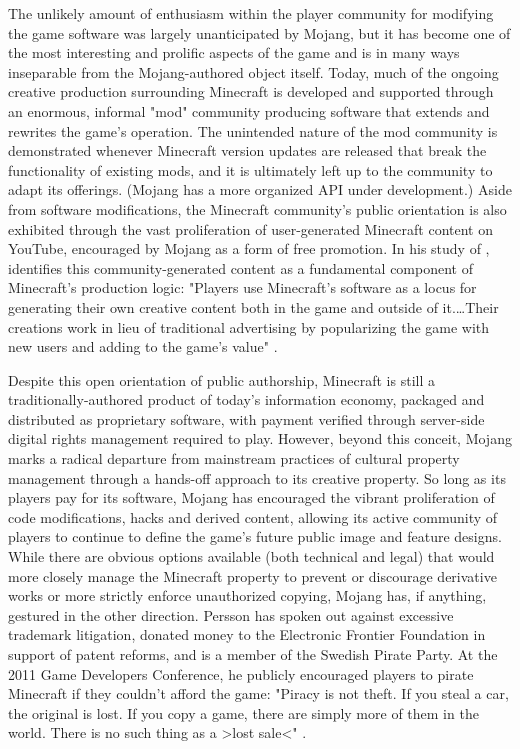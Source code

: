 The unlikely amount of enthusiasm within the player community for modifying the game software was largely unanticipated by Mojang, but it has become one of the most interesting and prolific aspects of the game and is in many ways inseparable from the Mojang-authored object itself. Today, much of the ongoing creative production surrounding Minecraft is developed and supported through an enormous, informal "mod" community producing software that extends and rewrites the game's operation. The unintended nature of the mod community is demonstrated whenever Minecraft version updates are released that break the functionality of existing mods, and it is ultimately left up to the community to adapt its offerings. (Mojang has a more organized API under development.) Aside from software modifications, the Minecraft community's public orientation is also exhibited through the vast proliferation of user-generated Minecraft content on YouTube, encouraged by Mojang as a form of free promotion. In his study of , \citeauthor{Lastowka2012-89e} identifies this community-generated content as a fundamental component of Minecraft's production logic: "Players use Minecraft's software as a locus for generating their own creative content both in the game and outside of it.…Their creations work in lieu of traditional advertising by popularizing the game with new users and adding to the game's value" \autocite[10]{Lastowka2012-89e}.

Despite this open orientation of public authorship, Minecraft is still a traditionally-authored product of today's information economy, packaged and distributed as proprietary software, with payment verified through server-side digital rights management required to play. However, beyond this conceit, Mojang marks a radical departure from mainstream practices of cultural property management through a hands-off approach to its creative property. So long as its players pay for its software, Mojang has encouraged the vibrant proliferation of code modifications, hacks and derived content, allowing its active community of players to continue to define the game's future public image and feature designs. While there are obvious options available (both technical and legal) that would more closely manage the Minecraft property to prevent or discourage derivative works or more strictly enforce unauthorized copying, Mojang has, if anything, gestured in the other direction. Persson has spoken out against excessive trademark litigation, donated money to the Electronic Frontier Foundation in support of patent reforms, and is a member of the Swedish Pirate Party. At the 2011 Game Developers Conference, he publicly encouraged players to pirate Minecraft if they couldn't afford the game: "Piracy is not theft. If you steal a car, the original is lost. If you copy a game, there are simply more of them in the world. There is no such thing as a >lost sale<" \autocite[qtd. in][]{Thier-2012}.

